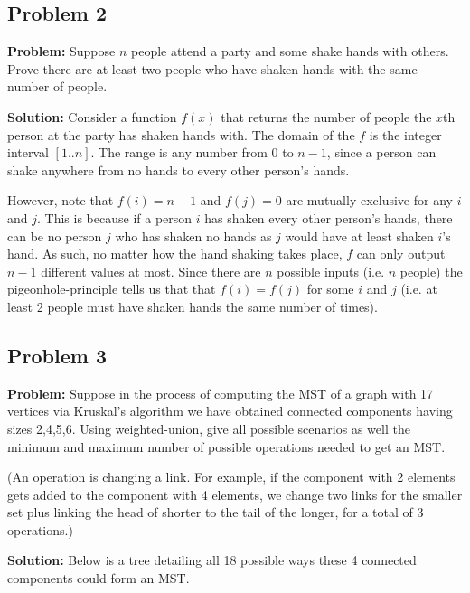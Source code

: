 \documentclass{article}
\begin{document}
\subsection*{Problem 2}
\noindent\textbf{Problem:} Suppose $n$ people attend a party and some shake hands with others. Prove there are at least two people who have shaken hands with the same number of people.
\bigskip

\noindent\textbf{Solution:} Consider a function $f(x)$ that returns the number of people the $x$th person at the party has shaken hands with. The domain of the $f$ is the integer interval $[1..n]$. The range is any number from 0 to $n-1$, since a person can shake anywhere from no hands to every other person's hands.

However, note that $f(i)=n-1$ and $f(j)=0$ are mutually exclusive for any $i$ and $j$. This is because if a person $i$ has shaken every other person's hands, there can be no person $j$ who has shaken no hands as $j$ would have at least shaken $i$'s hand. As such, no matter how the hand shaking takes place, $f$ can only output $n-1$ different values at most. Since there are $n$ possible inputs (i.e. $n$ people) the pigeonhole-principle tells us that that $f(i)=f(j)$ for some $i$ and $j$ (i.e. at least 2 people must have shaken hands the same number of times).

\subsection*{Problem 3}
\noindent\textbf{Problem:} Suppose in the process of computing the MST of a graph with 17 vertices via Kruskal’s algorithm we have obtained connected components having sizes 2,4,5,6. Using weighted-union, give all possible scenarios as well the minimum and maximum number of possible operations needed to get an MST.

(An operation is changing a link. For example, if the component with 2 elements gets added to the component with 4 elements, we change two links for the smaller set plus linking the head of shorter to the tail of
the longer, for a total of 3 operations.)
\bigskip

\noindent\textbf{Solution:} Below is a tree detailing all 18 possible ways these 4 connected components could form an MST.
\medskip
\end{document}
